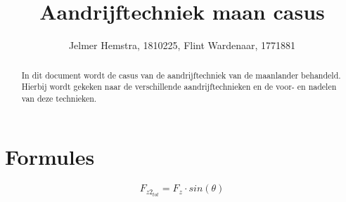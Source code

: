 \documentclass{article}
\title{Aandrijftechniek maan casus}
\author{Jelmer Hemstra, 1810225, Flint Wardenaar, 1771881}
\begin{document}
    \maketitle

    \begin{abstract}
        In dit document wordt de casus van de aandrijftechniek van de maanlander behandeld. Hierbij wordt gekeken naar de verschillende aandrijftechnieken en de voor- en nadelen van deze technieken.

    \end{abstract}


\section{Formules}
    $$
        F_{z2_{tot}} = F_z \cdot sin(\theta)
    $$
\end{document}
